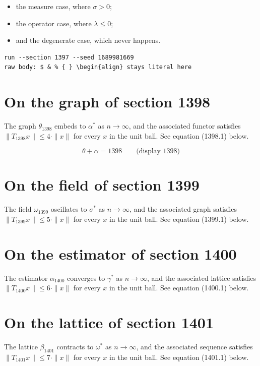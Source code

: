 \documentclass{article}
\begin{document}
\begin{itemize}
  \item the measure case, where $\sigma > 0$;
  \item the operator case, where $\lambda \leq 0$;
  \item and the degenerate case, which never happens.
\end{itemize}

\begin{verbatim}
run --section 1397 --seed 1689981669
raw body: $ & % { } \begin{align} stays literal here
\end{verbatim}

\section{On the graph of section 1398}
The graph $\theta_{1398}$ embeds to $\alpha^{*}$ as $n \to \infty$,
and the associated functor satisfies $\|T_{1398} x\| \leq 4 \cdot \|x\|$
for every $x$ in the unit ball. See equation (1398.1) below.

$$
\theta + \alpha = 1398 \qquad \text{(display 1398)}
$$

\section{On the field of section 1399}
The field $\omega_{1399}$ oscillates to $\sigma^{*}$ as $n \to \infty$,
and the associated graph satisfies $\|T_{1399} x\| \leq 5 \cdot \|x\|$
for every $x$ in the unit ball. See equation (1399.1) below.

\section{On the estimator of section 1400}
The estimator $\alpha_{1400}$ converges to $\gamma^{*}$ as $n \to \infty$,
and the associated lattice satisfies $\|T_{1400} x\| \leq 6 \cdot \|x\|$
for every $x$ in the unit ball. See equation (1400.1) below.

\section{On the lattice of section 1401}
The lattice $\beta_{1401}$ contracts to $\omega^{*}$ as $n \to \infty$,
and the associated sequence satisfies $\|T_{1401} x\| \leq 7 \cdot \|x\|$
for every $x$ in the unit ball. See equation (1401.1) below.
\end{document}
